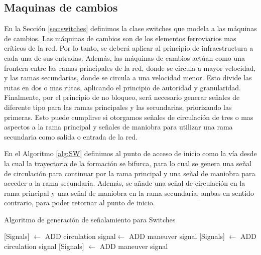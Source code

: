 \subsection{Maquinas de cambios}
	\label{sec:signal_switches}
	
    
    En la Sección \ref{sec:switches} definimos la clase switches que modela a las máquinas de cambios. Las máquinas de cambios son de los elementos ferroviarios mas críticos de la red. Por lo tanto, se deberá aplicar al principio de infraestructura a cada una de sus entradas. Además, las máquinas de cambios actúan como una frontera entre las ramas principales de la red, donde se circula a mayor velocidad, y las ramas secundarias, donde se circula a una velocidad menor. Esto divide las rutas en dos o mas rutas, aplicando el principio de autoridad y granularidad. Finalmente, por el principio de no bloqueo, será necesario generar señales de diferente tipo para las ramas principales y las secundarias, priorizando las primeras. Esto puede cumplirse si otorgamos señales de circulación de tres o mas aspectos a la rama principal y señales de maniobra para utilizar una rama secundaria como salida o entrada de la red.
    
    En el Algoritmo \ref{alg:SW} definimos al punto de acceso de inicio como la vía desde la cual la trayectoria de la formación se bifurca, para lo cual se genera una señal de circulación para continuar por la rama principal y una señal de maniobra para acceder a la rama secundaria. Además, se añade una señal de circulación en la rama principal y una señal de maniobra en la rama secundaria, ambas en sentido contrario, para poder retornar al punto de inicio. 
    
    \begin{algorithm}[hbt!]
        \caption{Algoritmo de generación de señalamiento para Switches}\label{alg:SW}
        \DontPrintSemicolon
        \SetNoFillComment
        \LinesNotNumbered 
        {
            {
                {
                    [Signals] $\gets$ ADD circulation signal\;
                    [Signals] $\gets$ ADD maneuver signal\;
                }
                {
                    [Signals] $\gets$ ADD circulation signal\;
                }
                {
                    [Signals] $\gets$ ADD maneuver signal\;
                }
            }   
        }
        \KwResult{[Signals]} 
    \end{algorithm}

